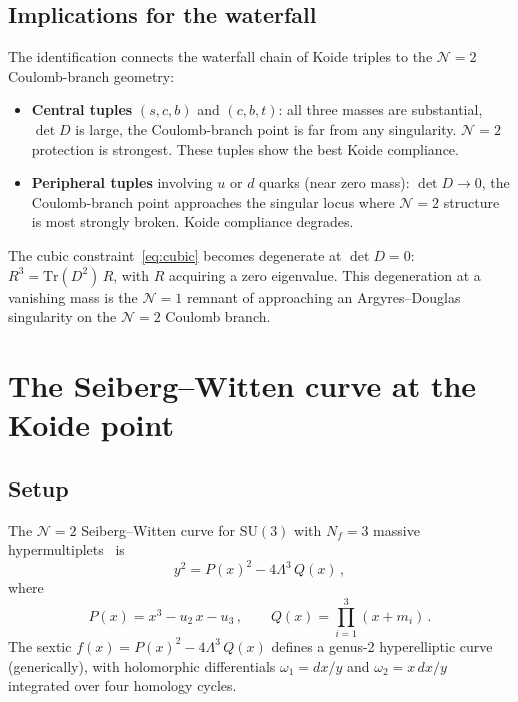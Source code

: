 \documentclass[aps,prd,twocolumn,showpacs,preprintnumbers,superscriptaddress,floatfix]{revtex4-2}
\newcommand{\SU}{\mathrm{SU}}
\newcommand{\Nf}{N_{\!f}}
\newcommand{\Tr}{\mathrm{Tr}}
\begin{document}
\subsection{Implications for the waterfall}

The identification connects the waterfall chain of Koide triples to
the $\mathcal{N}{=}2$ Coulomb-branch geometry:

\begin{itemize}
  \item \textbf{Central tuples} $(s,c,b)$ and $(c,b,t)$: all three
    masses are substantial, $\det D$ is large, the Coulomb-branch
    point is far from any singularity.
    $\mathcal{N}{=}2$ protection is strongest.
    These tuples show the best Koide compliance.

  \item \textbf{Peripheral tuples} involving $u$ or $d$ quarks
    (near zero mass): $\det D \to 0$, the Coulomb-branch point
    approaches the singular locus where $\mathcal{N}{=}2$ structure
    is most strongly broken.
    Koide compliance degrades.
\end{itemize}

The cubic constraint~\eqref{eq:cubic} becomes degenerate at
$\det D = 0$: $R^3 = \Tr(D^2)\,R$, with $R$ acquiring a zero
eigenvalue.
This degeneration at a vanishing mass is the $\mathcal{N}{=}1$
remnant of approaching an Argyres--Douglas singularity on the
$\mathcal{N}{=}2$ Coulomb branch.


\section{The Seiberg--Witten curve at the Koide point}
\label{sec:SW}

\subsection{Setup}

The $\mathcal{N}{=}2$ Seiberg--Witten curve for $\SU(3)$ with
$\Nf = 3$ massive
hypermultiplets~\cite{SeibergWitten:1994b,ArgyresPlesserShapere:1996}
is
\begin{equation}
  y^2 = P(x)^2 - 4\Lambda^3\,Q(x)\,,
  \label{eq:SWcurve}
\end{equation}
where
\begin{equation}
  P(x) = x^3 - u_2\,x - u_3\,,
  \qquad
  Q(x) = \prod_{i=1}^{3}(x + m_i)\,.
\end{equation}
The sextic $f(x) = P(x)^2 - 4\Lambda^3\,Q(x)$ defines a genus-2
hyperelliptic curve (generically), with holomorphic differentials
$\omega_1 = dx/y$ and $\omega_2 = x\,dx/y$ integrated over four
homology cycles.
\end{document}
